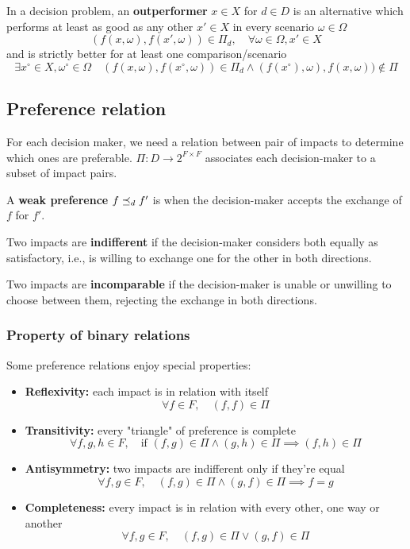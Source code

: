 In a decision problem, an \textbf{outperformer} $x \in X$ for $d \in D$ is an alternative which performs at least as good as any other $x' \in X$ in every scenario $\omega \in \Omega$
$$ (f(x, \omega), f(x', \omega)) \in \Pi_d, \quad \forall \omega \in \Omega, x' \in X $$
and is strictly better for at least one comparison/scenario
$$ \exists x^\circ \in X, \omega^\circ \in \Omega \quad (f(x, \omega), f(x^\circ, \omega)) \in \Pi_d \wedge (f(x^\circ), \omega), f(x, \omega)) \notin \Pi$$

\subsection{Preference relation}

For each decision maker, we need a relation between pair of impacts to determine which ones are preferable. $\Pi: D \rightarrow 2^{F \times F}$ associates each decision-maker to a subset of impact pairs.

A \textbf{weak preference} $f \preceq_{d} f'$ is when the decision-maker accepts the exchange of $f$ for $f'$.

Two impacts are \textbf{indifferent} if the decision-maker considers both equally as satisfactory, i.e., is willing to exchange one for the other in both directions.

Two impacts are \textbf{incomparable} if the decision-maker is unable or unwilling to choose between them, rejecting the exchange in both directions.

\subsubsection{Property of binary relations}

Some preference relations enjoy special properties: 
\begin{itemize}
	\item \textbf{Reflexivity:} each impact is in relation with itself
	$$ \forall f \in F, \quad (f,f) \in \Pi $$
	
	\item \textbf{Transitivity:} every "triangle" of preference is complete
	$$ \forall f,g,h \in F, \quad \text{if } (f,g) \in \Pi \wedge (g,h) \in \Pi \implies (f,h) \in \Pi $$
	
	\item \textbf{Antisymmetry:} two impacts are indifferent only if they're equal
	$$ \forall f,g \in F, \quad (f,g) \in \Pi \wedge (g,f) \in \Pi \implies f = g $$
	
	\item \textbf{Completeness:} every impact is in relation with every other, one way or another
	$$ \forall f,g \in F, \quad (f,g) \in \Pi \vee (g,f) \in \Pi $$
\end{itemize}

